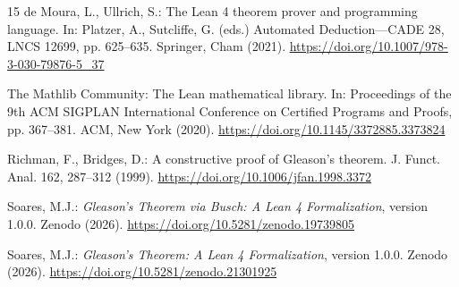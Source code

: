 \documentclass[pdflatex,sn-mathphys-num]{sn-jnl}
\theoremstyle{thmstyleone}
\theoremstyle{thmstylethree}
\begin{document}
\begin{thebibliography}{15}
 de Moura, L., Ullrich, S.: The Lean 4 theorem prover and programming language. In: Platzer, A., Sutcliffe, G. (eds.) Automated Deduction---CADE 28, LNCS 12699, pp. 625--635. Springer, Cham (2021). \url{https://doi.org/10.1007/978-3-030-79876-5_37}

 The Mathlib Community: The Lean mathematical library. In: Proceedings of the 9th ACM SIGPLAN International Conference on Certified Programs and Proofs, pp. 367--381. ACM, New York (2020). \url{https://doi.org/10.1145/3372885.3373824}

 Richman, F., Bridges, D.: A constructive proof of Gleason's theorem. J. Funct. Anal. 162, 287--312 (1999). \url{https://doi.org/10.1006/jfan.1998.3372}

 Soares, M.J.: \emph{Gleason's Theorem via Busch: A Lean 4 Formalization}, version 1.0.0. Zenodo (2026). \url{https://doi.org/10.5281/zenodo.19739805}

 Soares, M.J.: \emph{Gleason's Theorem: A Lean 4 Formalization}, version 1.0.0. Zenodo (2026). \url{https://doi.org/10.5281/zenodo.21301925}

\end{thebibliography}
\end{document}
